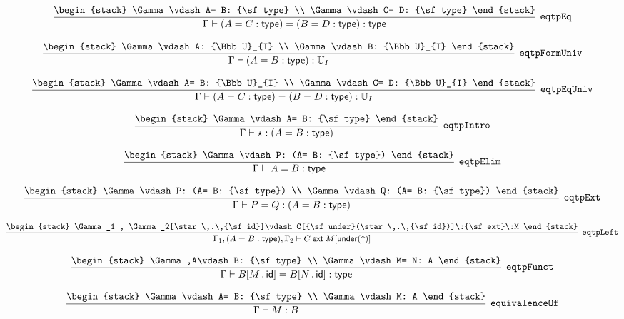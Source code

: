 \[
\infer[{\tt eqtpEq}]{\Gamma \vdash (A= C: {\sf type})= (B= D: {\sf type}): {\sf type}}{
\begin{stack}
\Gamma \vdash A= B: {\sf type}
\\
\Gamma \vdash C= D: {\sf type}
\end{stack}}
\]

\[
\infer[{\tt eqtpFormUniv}]{\Gamma \vdash (A= B: {\sf type}): {\Bbb U}_{I}}{
\begin{stack}
\Gamma \vdash A: {\Bbb U}_{I}
\\
\Gamma \vdash B: {\Bbb U}_{I}
\end{stack}}
\]

\[
\infer[{\tt eqtpEqUniv}]{\Gamma \vdash (A= C: {\sf type})= (B= D: {\sf type}): {\Bbb U}_{I}}{
\begin{stack}
\Gamma \vdash A= B: {\Bbb U}_{I}
\\
\Gamma \vdash C= D: {\Bbb U}_{I}
\end{stack}}
\]

\[
\infer[{\tt eqtpIntro}]{\Gamma \vdash \star : (A= B: {\sf type})}{
\begin{stack}
\Gamma \vdash A= B: {\sf type}
\end{stack}}
\]

\[
\infer[{\tt eqtpElim}]{\Gamma \vdash A= B: {\sf type}}{
\begin{stack}
\Gamma \vdash P: (A= B: {\sf type})
\end{stack}}
\]

\[
\infer[{\tt eqtpExt}]{\Gamma \vdash P= Q: (A= B: {\sf type})}{
\begin{stack}
\Gamma \vdash P: (A= B: {\sf type})
\\
\Gamma \vdash Q: (A= B: {\sf type})
\end{stack}}
\]

\[
\infer[{\tt eqtpLeft}]{\Gamma_1 ,(A= B: {\sf type}), \Gamma_2 \vdash C\:{\sf ext}\:M[{\sf under}(\uparrow )]}{
\begin{stack}
\Gamma_1 , \Gamma_2[\star \,.\,{\sf id}]\vdash C[{\sf under}(\star \,.\,{\sf id})]\:{\sf ext}\:M
\end{stack}}
\]

\[
\infer[{\tt eqtpFunct}]{\Gamma \vdash B[M\,.\,{\sf id}]= B[N\,.\,{\sf id}]: {\sf type}}{
\begin{stack}
\Gamma ,A\vdash B: {\sf type}
\\
\Gamma \vdash M= N: A
\end{stack}}
\]

\[
\infer[{\tt equivalenceOf}]{\Gamma \vdash M: B}{
\begin{stack}
\Gamma \vdash A= B: {\sf type}
\\
\Gamma \vdash M: A
\end{stack}}
\]

